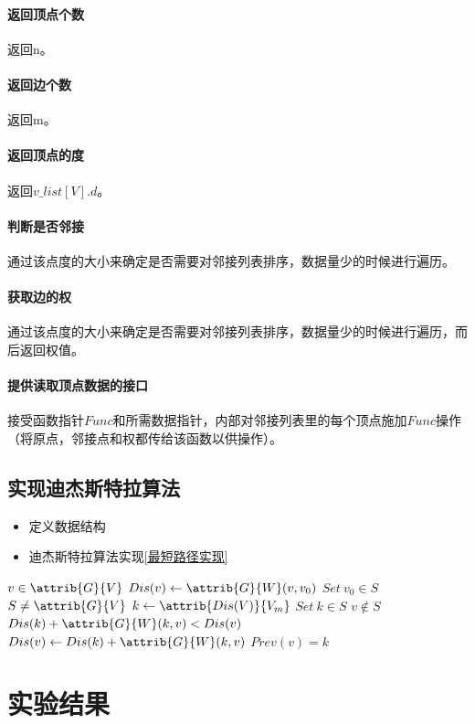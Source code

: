 \documentclass[a4paper,10pt]{ctexart}
\begin{document}
\paragraph{返回顶点个数}返回n。
\paragraph{返回边个数}返回m。
\paragraph{返回顶点的度}返回$v\_list[V].d$。
\paragraph{判断是否邻接}通过该点度的大小来确定是否需要对邻接列表排序，数据量少的时候进行遍历。
\paragraph{获取边的权}通过该点度的大小来确定是否需要对邻接列表排序，数据量少的时候进行遍历，而后返回权值。
\paragraph{提供读取顶点数据的接口}接受函数指针$Func$和所需数据指针，内部对邻接列表里的每个顶点施加$Func$操作（将原点，邻接点和权都传给该函数以供操作）。


\subsection{实现迪杰斯特拉算法}
\begin{itemize}
  \item 定义数据结构
  \item 迪杰斯特拉算法实现\ref{最短路径实现}
\end{itemize}
\begin{codebox}
\li \For $v \in \attrib{G}{V}$
    \Do
\li     $Dis(v) \gets \attrib{G}{W}(v,v_0)$
    \End
\li $Set \  v_0 \in S$
\li \While $S \ne \attrib{G}{V}$
    \Do
\li     $k \gets \attrib{Dis(V)}{V_m}$
\li     $Set \  k \in S$
\li     \For $v \notin S$
        \Do
\li        \If $Dis(k) + \attrib{G}{W}(k,v) < Dis(v)$
\li        \Then $Dis(v) \gets Dis(k) + \attrib{G}{W}(k,v)$
\li        $Prev(v) = k $
        \End
    \End
\end{codebox}
\section{实验结果}
\end{document}
